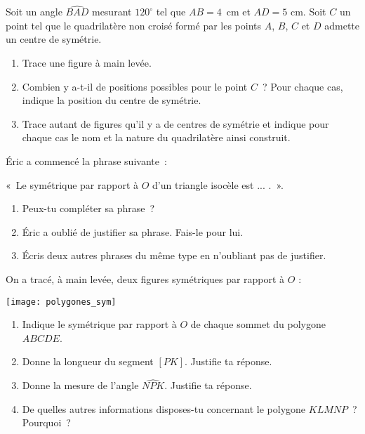 \begin{exercice}
Soit un angle $\widehat{BAD}$ mesurant $120^\circ$ tel que $AB = 4$ cm et $AD = 5$ cm. Soit $C$ un point tel que le quadrilatère non croisé formé par les points $A$, $B$, $C$ et $D$ admette un centre de symétrie.
\begin{enumerate}
 \item Trace une figure à main levée.
 \item Combien y a-t-il de positions possibles pour le point $C$ ? Pour chaque cas, indique la position du centre de symétrie.
 \item Trace autant de figures qu'il y a de centres de symétrie et indique pour chaque cas le nom et la nature du quadrilatère ainsi construit.
 \end{enumerate}
\end{exercice}


\begin{exercice}
Éric a commencé la phrase suivante :
 \begin{center} « Le symétrique par rapport à $O$ d'un triangle isocèle est ... . ». \end{center}
 \begin{enumerate}
  \item Peux-tu compléter sa phrase ?
  \item Éric a oublié de justifier sa phrase. Fais-le pour lui.
  \item Écris deux autres phrases du même type en n'oubliant pas de justifier.
  \end{enumerate}
\end{exercice}


\begin{exercice}
On a tracé, à main levée, deux figures symétriques par rapport à $O$ :
 \begin{center} \texttt{[image: polygones\_sym]} \end{center}
\begin{enumerate}       
 \item Indique le symétrique par rapport à $O$ de chaque sommet du polygone $ABCDE$.
 \item Donne la longueur du segment $[PK]$. Justifie ta réponse.
 \item Donne la mesure de l'angle $\widehat{NPK}$. Justifie ta réponse.
 \item De quelles autres informations disposes-tu  concernant le polygone $KLMNP$ ? Pourquoi ?
 \end{enumerate}
\end{exercice}

